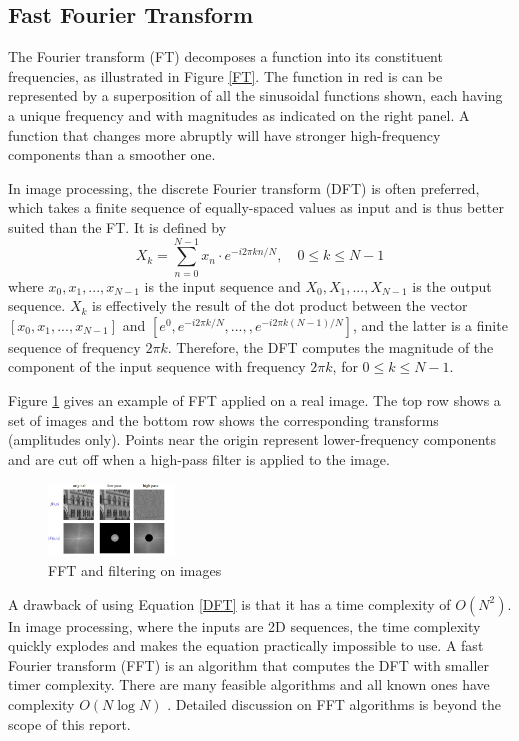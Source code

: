 \documentclass{article}
\begin{document}
\subsection{Fast Fourier Transform}
The Fourier transform (FT) decomposes a function into its constituent frequencies, as illustrated in Figure \ref{FT}. The function in red is can be represented by a superposition of all the sinusoidal functions shown, each having a unique frequency and with magnitudes as indicated on the right panel. A function that changes more abruptly will have stronger high-frequency components than a smoother one. 

In image processing, the discrete Fourier transform (DFT) is often preferred, which takes a finite sequence of equally-spaced values as input and is thus better suited than the FT. It is defined by
\begin{equation}
    X_k = \sum_{n=0}^{N-1} x_n \cdot e^{-i2\pi kn/N}, \quad 0 \leq k \leq N-1
    \label{DFT}
\end{equation}
where $x_0,x_1,...,x_{N-1}$ is the input sequence and $X_0,X_1,...,X_{N-1}$ is the output sequence. $X_k$ is effectively the result of the dot product between the vector $[x_0,x_1,...,x_{N-1}]$ and $[e^0,e^{-i2\pi k/N},...,,e^{-i2\pi k(N-1)/N}]$, and the latter is a finite sequence of frequency $2\pi k$. Therefore, the DFT computes the magnitude of the component of the input sequence with frequency $2\pi k$, for $0 \leq k \leq N-1$.

Figure \ref{FFT on images} gives an example of FFT applied on a real image. The top row shows a set of images and the bottom row shows the corresponding transforms (amplitudes only). Points near the origin represent lower-frequency components and are cut off when a high-pass filter is applied to the image.

\begin{figure}
    \centering
    \includegraphics[width=0.3\textwidth]{Images/FFT on images.jpg}
    \caption{FFT and filtering on images \cite{Fourier transform lecture}}
    \label{FFT on images}
\end{figure}

A drawback of using Equation \ref{DFT} is that it has a time complexity of $O(N^2)$. In image processing, where the inputs are 2D sequences, the time complexity quickly explodes and makes the equation practically impossible to use. A fast Fourier transform (FFT) is an algorithm that computes the DFT with smaller timer complexity. There are many feasible algorithms and all known ones have complexity $O(N\log N)$ \cite{Fast Fourier transform wiki}. Detailed discussion on FFT algorithms is beyond the scope of this report.
\end{document}
